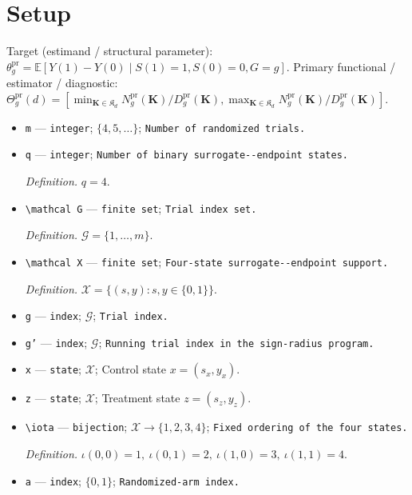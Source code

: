 \documentclass{article}
\begin{document}
\section{Setup}

Target (estimand / structural parameter): \(\theta_g^{\mathrm{pr}}=\mathbb E[Y(1)-Y(0)\mid S(1)=1,S(0)=0,G=g]\).
Primary functional / estimator / diagnostic: \(\Theta_g^{\mathrm{pr}}(d)=[\min_{\mathbf K\in\mathfrak K_d}N_g^{\mathrm{pr}}(\mathbf K)/D_g^{\mathrm{pr}}(\mathbf K),\max_{\mathbf K\in\mathfrak K_d}N_g^{\mathrm{pr}}(\mathbf K)/D_g^{\mathrm{pr}}(\mathbf K)]\).
\begin{itemize}
  \item \texttt{m} --- \texttt{integer}; \(\{4,5,\ldots\}\); \texttt{Number of randomized trials.}
  \item \texttt{q} --- \texttt{integer}; \texttt{Number of binary surrogate-\allowbreak{}-\allowbreak{}endpoint states.}
  \par\smallskip\noindent\emph{Definition.} \(q=4\).
  \item \texttt{\textbackslash{}\allowbreak{}mathcal G} --- \texttt{finite set}; \texttt{Trial index set.}
  \par\smallskip\noindent\emph{Definition.} \(\mathcal G=\{1,\ldots,m\}\).
  \item \texttt{\textbackslash{}\allowbreak{}mathcal X} --- \texttt{finite set}; \texttt{Four-\allowbreak{}state surrogate-\allowbreak{}-\allowbreak{}endpoint support.}
  \par\smallskip\noindent\emph{Definition.} \(\mathcal X=\{(s,y):s,y\in\{0,1\}\}\).
  \item \texttt{g} --- \texttt{index}; \(\mathcal G\); \texttt{Trial index.}
  \item \texttt{g'} --- \texttt{index}; \(\mathcal G\); \texttt{Running trial index in the sign-\allowbreak{}radius program.}
  \item \texttt{x} --- \texttt{state}; \(\mathcal X\); Control state \(x=(s_x,y_x)\).
  \item \texttt{z} --- \texttt{state}; \(\mathcal X\); Treatment state \(z=(s_z,y_z)\).
  \item \texttt{\textbackslash{}\allowbreak{}iota} --- \texttt{bijection}; \(\mathcal X\to\{1,2,3,4\}\); \texttt{Fixed ordering of the four states.}
  \par\smallskip\noindent\emph{Definition.} \(\iota(0,0)=1,\ \iota(0,1)=2,\ \iota(1,0)=3,\ \iota(1,1)=4\).
  \item \texttt{a} --- \texttt{index}; \(\{0,1\}\); \texttt{Randomized-\allowbreak{}arm index.}

\end{itemize}
\end{document}

